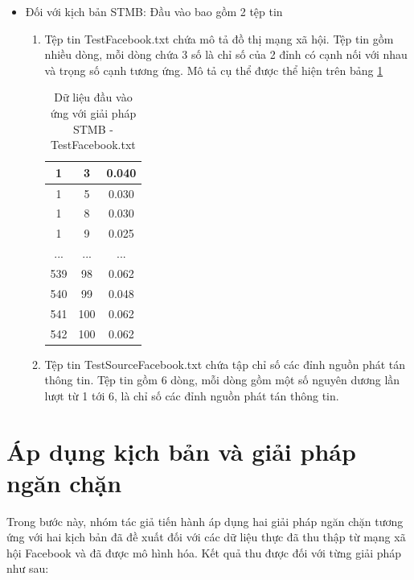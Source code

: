 \begin{itemize}
	\item Đối với kịch bản STMB: Đầu vào bao gồm 2 tệp tin
	\begin{enumerate}[+]
		\item Tệp tin TestFacebook.txt chứa mô tả đồ thị mạng xã hội. Tệp tin gồm nhiều dòng, mỗi dòng chứa 3 số là chỉ số của 2 đỉnh có cạnh nối với nhau và trọng số cạnh tương ứng.
		Mô tả cụ thể được thể hiện trên bảng \ref{bang4_4}
		\begin{table} [!htp]
			\centering
			\begin{tabular}{|c|c|c|}
				\hline 
				1 & 3 & 0.040\\ 
				\hline 
				1 & 5 & 0.030\\ 
				\hline 
				1 & 8 & 0.030\\ 
				\hline 
				1 & 9 & 0.025\\ 
				\hline 
				... & ... & ...\\ 
				539 & 98 & 0.062\\
				\hline 
				540 & 99 & 0.048\\
				\hline 
				541 & 100 & 0.062\\
				\hline 
				542 & 100 & 0.062\\		
				\hline 
			\end{tabular}
			\caption{Dữ liệu đầu vào ứng với giải pháp STMB - TestFacebook.txt}
			\label{bang4_4} 
		\end{table}
	
		\item Tệp tin TestSourceFacebook.txt chứa tập chỉ số các đỉnh nguồn phát tán thông tin. Tệp tin gồm 6 dòng, mỗi dòng gồm một số nguyên dương lần lượt từ 1 tới 6, là chỉ số các đỉnh nguồn phát tán thông tin.
	\end{enumerate}
	\end{itemize}
	
\section{Áp dụng kịch bản và giải pháp ngăn chặn}
\label{C4_buoc3}

Trong bước này, nhóm tác giả tiến hành áp dụng hai giải pháp ngăn chặn tương ứng với hai kịch bản đã đề xuất đối với các dữ liệu thực đã thu thập từ mạng xã hội Facebook và đã được mô hình hóa. Kết quả thu được đối với từng giải pháp như sau:

